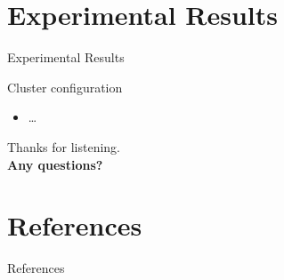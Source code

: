 \documentclass[aspectratio=43,t]{beamer}
\begin{document}
  \section{Experimental Results}
  \begin{frame}{Experimental Results}
    \begin{block}{Cluster configuration}
      \begin{itemize}
        \item \dots
      \end{itemize}
    \end{block}
  \end{frame}



  { %
    \begin{frame}[c,noframenumbering]
      \begin{center}
        Thanks for listening.\\
        {\bf Any questions?}
      \end{center}
    \end{frame}

    \section*{References}
    \begin{frame}{References}
      \printbibliography
    \end{frame}
  }
\end{document}
